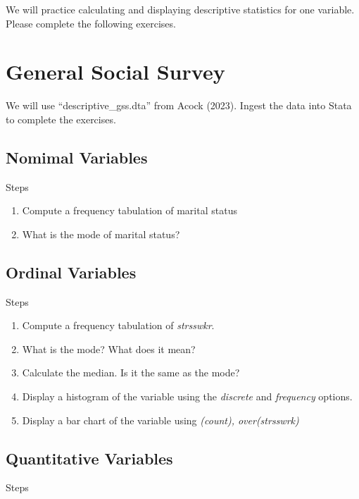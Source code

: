 \documentclass[
]{book}
\providecommand{\tightlist}{%
  \setlength{\itemsep}{0pt}\setlength{\parskip}{0pt}}
\begin{document}
We will practice calculating and displaying descriptive statistics for one variable. Please complete the following exercises.

\section{General Social Survey}\label{general-social-survey}

We will use ``descriptive\_gss.dta'' from Acock (2023). Ingest the data into Stata to complete the exercises.

\subsection{Nomimal Variables}\label{nomimal-variables}

Steps

\begin{enumerate}
\def\labelenumi{\arabic{enumi}.}
\tightlist
\item
  Compute a frequency tabulation of marital status
\item
  What is the mode of marital status?
\end{enumerate}

\subsection{Ordinal Variables}\label{ordinal-variables}

Steps

\begin{enumerate}
\def\labelenumi{\arabic{enumi}.}
\tightlist
\item
  Compute a frequency tabulation of \emph{strsswkr}.
\item
  What is the mode? What does it mean?
\item
  Calculate the median. Is it the same as the mode?
\item
  Display a histogram of the variable using the \emph{discrete} and \emph{frequency} options.
\item
  Display a bar chart of the variable using \emph{(count), over(strsswrk)}
\end{enumerate}

\subsection{Quantitative Variables}\label{quantitative-variables-1}

Steps
\end{document}
